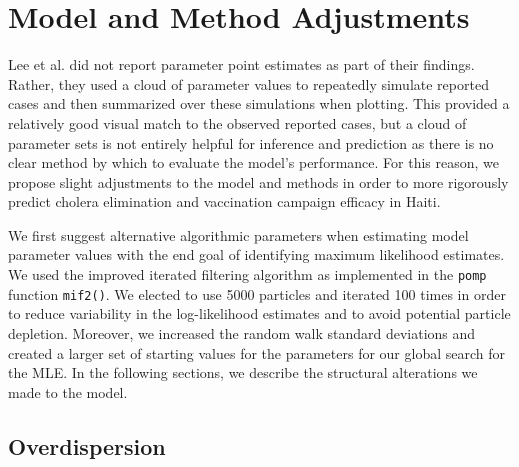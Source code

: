 \documentclass[12pt]{article}
\begin{document}
\section{Model and Method Adjustments}

 Lee et al. did not report parameter point estimates as part of their findings. Rather, they used a cloud of parameter values to repeatedly simulate reported cases and then summarized over these simulations when plotting. This provided a relatively good visual match to the observed reported cases, but a cloud of parameter sets is not entirely helpful for inference and prediction as there is no clear method by which to evaluate the model's performance. For this reason, we propose slight adjustments to the model and methods in order to more rigorously predict cholera elimination and vaccination campaign efficacy in Haiti.

  We first suggest alternative algorithmic parameters when estimating model parameter values with the end goal of identifying maximum likelihood estimates. We used the improved iterated filtering algorithm as implemented in the \texttt{pomp} function \texttt{mif2()}. We elected to use 5000 particles and iterated 100 times in order to reduce variability in the log-likelihood estimates and to avoid potential particle depletion. Moreover, we increased the random walk standard deviations and created a larger set of starting values for the parameters for our global search for the MLE. In the following sections, we describe the structural alterations we made to the model.

\subsection{Overdispersion}
\end{document}
